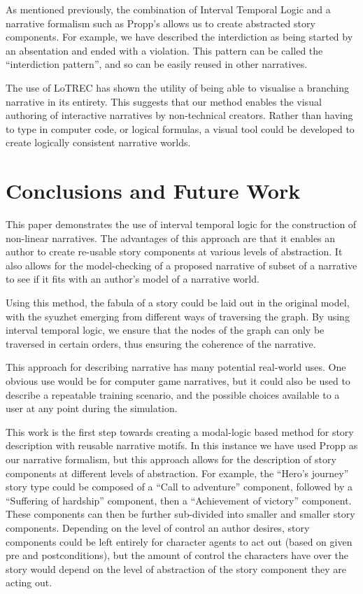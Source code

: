 \documentclass{llncs}
\begin{document}
As mentioned previously, the combination of Interval Temporal Logic and a narrative formalism such as Propp's allows us to create abstracted story components. For example, we have described the interdiction as being started by an absentation and ended with a violation. This pattern can be called the ``interdiction pattern'', and so can be easily reused in other narratives.

The use of LoTREC has shown the utility of being able to visualise a branching narrative in its entirety. This suggests that our method enables the visual authoring of interactive narratives by non-technical creators. Rather than having to type in computer code, or logical formulas, a visual tool could be developed to create logically consistent narrative worlds.

\section{Conclusions and Future Work}
This paper demonstrates the use of interval temporal logic for the construction of non-linear narratives. The advantages of this approach are that it enables an author to create re-usable story components at various levels of abstraction. It also allows for the model-checking of a proposed narrative of subset of a narrative to see if it fits with an author's model of a narrative world.

Using this method, the fabula of a story could be laid out in the original model, with the syuzhet emerging from different ways of traversing the graph. By using interval temporal logic, we ensure that the nodes of the graph can only be traversed in certain orders, thus ensuring the coherence of the narrative.

This approach for describing narrative has many potential real-world uses. One obvious use would be for computer game narratives, but it could also be used to describe a repeatable training scenario, and the possible choices available to a user at any point during the simulation.

This work is the first step towards creating a modal-logic based method for story description with reusable narrative motifs. In this instance we have used Propp as our narrative formalism, but this approach allows for the description of story components at different levels of abstraction. For example, the ``Hero's journey'' story type could be composed of a ``Call to adventure'' component, followed by a ``Suffering of hardship'' component, then a ``Achievement of victory'' component. These components can then be further sub-divided into smaller and smaller story components. Depending on the level of control an author desires, story components could be left entirely for character agents to act out (based on given pre and postconditions), but the amount of control the characters have over the story would depend on the level of abstraction of the story component they are acting out.
\end{document}

